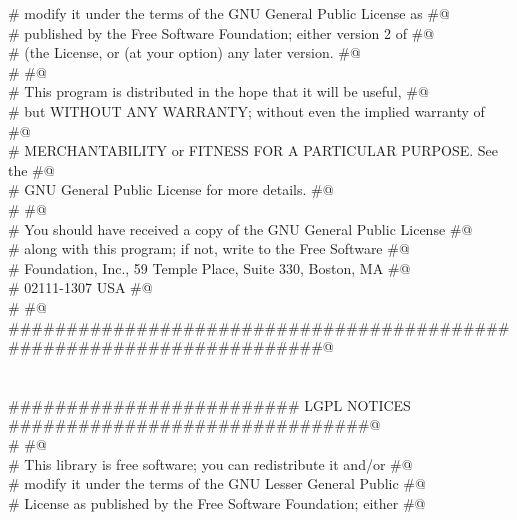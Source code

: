 \documentclass[10pt,a4paper,twoside,notitlepage]{article}
\begin{document}
\begin{flushleft}
\begin{list}{}{}
\mbox{}\verb@# modify it under the terms of the GNU General Public License as     #@\\
\mbox{}\verb@# published by the Free Software Foundation; either version 2 of     #@\\
\mbox{}\verb@# (the License, or (at your option) any later version.               #@\\
\mbox{}\verb@#                                                                    #@\\
\mbox{}\verb@# This program is distributed in the hope that it will be useful,    #@\\
\mbox{}\verb@# but WITHOUT ANY WARRANTY; without even the implied warranty of     #@\\
\mbox{}\verb@# MERCHANTABILITY or FITNESS FOR A PARTICULAR PURPOSE.  See the      #@\\
\mbox{}\verb@# GNU General Public License for more details.                       #@\\
\mbox{}\verb@#                                                                    #@\\
\mbox{}\verb@# You should have received a copy of the GNU General Public License  #@\\
\mbox{}\verb@# along with this program; if not, write to the Free Software        #@\\
\mbox{}\verb@# Foundation, Inc., 59 Temple Place, Suite 330, Boston, MA           #@\\
\mbox{}\verb@# 02111-1307  USA                                                    #@\\
\mbox{}\verb@#                                                                    #@\\
\mbox{}\verb@######################################################################@\\
\mbox{}\verb@@\\
\mbox{}\verb@@\\
\mbox{}\verb@######################### LGPL NOTICES ###############################@\\
\mbox{}\verb@#                                                                    #@\\
\mbox{}\verb@# This library is free software; you can redistribute it and/or      #@\\
\mbox{}\verb@# modify it under the terms of the GNU Lesser General Public         #@\\
\mbox{}\verb@# License as published by the Free Software Foundation; either       #@\\

\end{list}
\end{flushleft}
\end{document}
